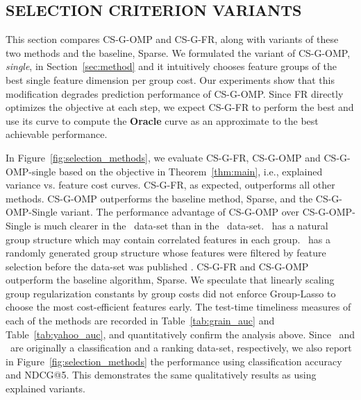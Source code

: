 \subsection{SELECTION CRITERION VARIANTS}
\label{sec:selection_methods}

This section compares CS-G-OMP and CS-G-FR, along with 
variants of these two methods and the baseline, Sparse. 
We formulated the variant of CS-G-OMP, \textit{single}, in Section~\ref{sec:method} and it intuitively chooses feature groups of the best single feature dimension per group cost. Our experiments show that this modification degrades prediction performance of CS-G-OMP. 
Since FR directly optimizes the objective at each step, we expect CS-G-FR to perform the best and use its curve to compute the \textbf{Oracle} curve as an approximate to the best achievable performance.

In Figure~\ref{fig:selection_methods}, we evaluate CS-G-FR, CS-G-OMP and CS-G-OMP-single based on the objective in Theorem~\ref{thm:main}, i.e., explained variance vs. feature cost curves. 
CS-G-FR, as expected, outperforms all other methods. CS-G-OMP outperforms the baseline method, Sparse, and the CS-G-OMP-Single variant. 
The performance advantage of CS-G-OMP over CS-G-OMP-Single is much clearer in the \Grain\ data-set than in the \YahooLTR\ data-set. \Grain\ has a natural group structure which may contain correlated features in each group. \YahooLTR\ has a randomly generated group structure whose features were filtered by feature selection before the data-set was published \citep{yahoo_ltr}. CS-G-FR and CS-G-OMP outperform the baseline algorithm, Sparse. We speculate that linearly scaling group regularization constants by group costs did not enforce Group-Lasso to choose the most cost-efficient features early. 
The test-time timeliness measures of each of the methods are recorded in Table~\ref{tab:grain_auc} and Table~\ref{tab:yahoo_auc},
and quantitatively confirm the analysis above. Since \Grain\, and \YahooLTR\, are originally a classification and a ranking data-set, respectively, we also report in Figure~\ref{fig:selection_methods} the performance using classification accuracy and NDCG@5. This demonstrates the same qualitatively results as using explained variants. 

